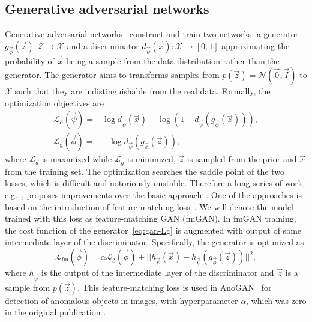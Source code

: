 \subsection{Generative adversarial networks} \label{sec:gan}
Generative adversarial networks~\cite{goodfellow2014generative} construct and train two networks: a generator $g_{\vec{\phi}}(\vec{z}):\mathcal{Z} \rightarrow \mathcal{X}$ and a discriminator $d_{\vec{\psi}}(\vec{x}) :\mathcal{X} \rightarrow \left[ 0,1 \right]$ approximating the probability
of $\vec{x}$ being a sample from the data distribution rather than the generator. The generator aims to transforms samples from $p(\vec{z}) = \mathcal{N}(\vec{0}, \vec{I})$ to $\mathcal{X}$ such that they are indistinguishable from the real data. Formally, the  optimization objectives are
\begin{align}
\mathcal{L}_{\text{d}}(\vec{\psi}) = & \log d_{\vec{\psi}}(\vec{x}) + \log \left( 1 - d_{\vec{\psi}}(g_{\vec{\phi}}(\vec{z})) \right) , \\
    \mathcal{L}_{\text{g}}(\vec{\phi}) = &- \log d_{\vec{\psi}}(g_{\vec{\phi}}(\vec{z})),\label{eq:gan-Lg}
\end{align}
where $\mathcal{L}_d$ is maximized while $\mathcal{L}_g$  is minimized, $\vec{z}$ is sampled from the prior and $\vec{x}$ from the training set. The optimization searches the saddle point of the two losses, which is difficult and notoriously unstable. Therefore a long series of work, e.g.~\cite{hong2019generative}, proposes improvements over the basic approach~\cite{goodfellow2014generative}. One of the approaches is based on the introduction of  feature-matching loss~\cite{salimans2016improved}. We will denote the model trained with this loss as feature-matching GAN  (fmGAN). In fmGAN training, the cost function of the generator~\ref{eq:gan-Lg} is augmented with output of some intermediate layer of the discriminator. Specifically, the generator is optimized as 
\begin{equation}
    \mathcal{L}_{\text{fm}}(\vec{\phi}) = \alpha \mathcal{L}_{\text{g}}(\vec{\phi}) + || h_{\vec{\psi}}(\vec{x}) - h_{\vec{\psi}}(g_{\vec{\phi}}(\vec{z})) ||^2,
    \label{eq:fmloss}
\end{equation}
where $h_{\vec{\psi}}$ is the output of the intermediate layer of the discriminator and $\vec{z}$ is a sample from $p(\vec{z})$. This feature-matching loss is used in AnoGAN~\cite{schlegl2017unsupervised} for detection of anomalous objects in images, with hyperparameter $\alpha$, which was zero in the original publication \cite{salimans2016improved}. 

